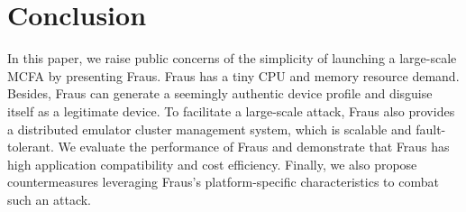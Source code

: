 \documentclass[conference]{IEEEtranl}
\begin{document}
	
	\section{Conclusion}\label{conclusion}
	In this paper, we raise public concerns of the simplicity of launching a large-scale MCFA by presenting Fraus. Fraus has a tiny CPU and memory resource demand. Besides, Fraus can generate a seemingly authentic device profile and disguise itself as a legitimate device. To facilitate a large-scale attack, Fraus also provides a distributed emulator cluster management system, which is scalable and fault-tolerant. We evaluate the performance of Fraus and demonstrate that Fraus has high application compatibility and cost efficiency. Finally, we also propose countermeasures leveraging Fraus's platform-specific characteristics to combat such an attack.

	\begin{spacing}{0.8} 

	
	
	\end{spacing}
	
\end{document}
